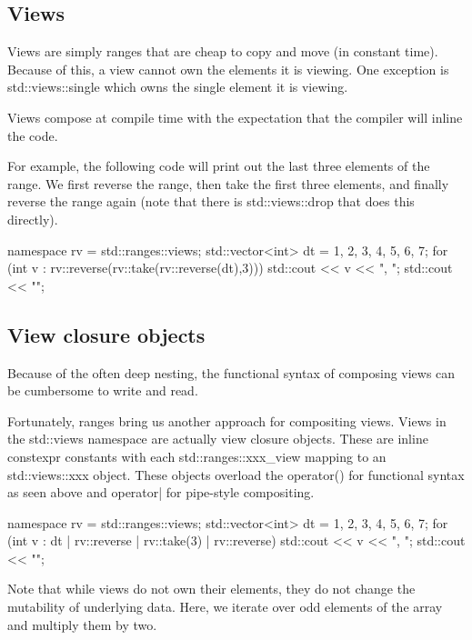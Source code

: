 \subsection{Views}

Views are simply ranges that are cheap to copy and move (in constant time). Because of this, a view cannot own the elements it is viewing. One exception is std::views::single which owns the single element it is viewing.

Views compose at compile time with the expectation that the compiler will inline the code.

For example, the following code will print out the last three elements of the range. We first reverse the range, then take the first three elements, and finally reverse the range again (note that there is std::views::drop that does this directly).

\begin{box-note}
\begin{cppcode}
namespace rv = std::ranges::views;
std::vector<int> dt = {1, 2, 3, 4, 5, 6, 7};
for (int v : rv::reverse(rv::take(rv::reverse(dt),3))) {
    std::cout << v << ", ";
}
std::cout << "\n";
\end{cppcode}
\end{box-note}

\subsection{View closure objects}

Because of the often deep nesting, the functional syntax of composing views can be cumbersome to write and read.

Fortunately, ranges bring us another approach for compositing views. Views in the std::views namespace are actually view closure objects. These are inline constexpr constants with each std::ranges::xxx\_view mapping to an std::views::xxx object. These objects overload the operator() for functional syntax as seen above and operator| for pipe-style compositing.

\begin{box-note}
\begin{cppcode}
namespace rv = std::ranges::views;
std::vector<int> dt = {1, 2, 3, 4, 5, 6, 7};
for (int v : dt | rv::reverse | rv::take(3) | rv::reverse) {
    std::cout << v << ", ";
}
std::cout << "\n";
\end{cppcode}
\end{box-note}

Note that while views do not own their elements, they do not change the mutability of underlying data. Here, we iterate over odd elements of the array and multiply them by two.

